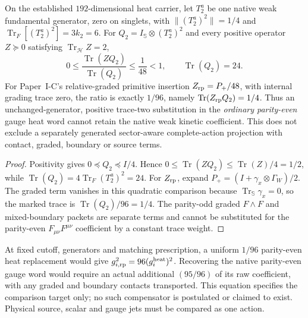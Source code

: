 \documentclass[12pt,a4paper]{article}
\begin{document}
\begin{proposition}
\label{p5:prop:v3036-positive-trace-two-weak-bound}
On the established $192$-dimensional heat carrier, let $T_2^a$ be
one native weak fundamental generator, zero on singlets, with
$\|(T_2^a)^2\|=1/4$ and
$\operatorname{Tr}_F[(T_2^a)^2]=3k_2=6$.
For $Q_2=I_{\mathbb S}\otimes(T_2^a)^2$ and every positive operator
$Z\succeq0$ satisfying $\operatorname{Tr}_{\mathcal H} Z=2$,
\begin{equation}\label{p5:eq:v3036-trace-two-gauge-bound}
 \boxed{0\le \frac{\operatorname{Tr}(ZQ_2)}{\operatorname{Tr}(Q_2)}
 \le\frac1{48}<1,\qquad \operatorname{Tr}(Q_2)=24.}
\end{equation}
For Paper~I-C's relative-graded primitive insertion
$Z_{\rm rp}=P_+/48$, with internal grading trace zero, the ratio is
exactly $1/96$, namely $\operatorname{Tr}(Z_{\rm rp}Q_2)=1/4$.
Thus an unchanged-generator, positive trace-two substitution in the
\emph{ordinary parity-even} gauge heat word cannot retain the native
weak kinetic coefficient.  This does not exclude a separately generated
sector-aware complete-action projection with contact, graded,
boundary or source terms.
\end{proposition}
\begin{proof}
Positivity gives $0\preceq Q_2\preceq I/4$. Hence
$0\le\operatorname{Tr}(ZQ_2)\le\operatorname{Tr}(Z)/4=1/2$,
while $\operatorname{Tr}(Q_2)=4\operatorname{Tr}_F(T_2^a)^2=24$.
For $Z_{\rm rp}$, expand $P_+=(I+\gamma_x\otimes\Gamma_W)/2$.
The graded term vanishes in this quadratic comparison because
$\operatorname{Tr}_{\mathbb S}\gamma_x=0$, so the marked trace is
$\operatorname{Tr}(Q_2)/96=1/4$.
The parity-odd graded $F\wedge F$ and mixed-boundary packets are
separate terms and cannot be substituted for the parity-even
$F_{\mu\nu}F^{\mu\nu}$ coefficient by a constant trace weight.
\end{proof}

\begin{remark}
\label{p5:rem:v3036-gauge-restoration-obligation}
At fixed cutoff, generators and matching prescription, a uniform
$1/96$ parity-even heat replacement would give
$g_{i,\rm rp}^2=96(g_i^{\rm heat})^2$.
Recovering the native parity-even gauge word would require an actual
additional $(95/96)$ of its raw coefficient, with any graded and
boundary contacts transported. This equation specifies the comparison
target only; no such compensator is postulated or claimed to exist.
Physical source, scalar and gauge jets must be compared as one action.
\end{remark}
\end{document}
